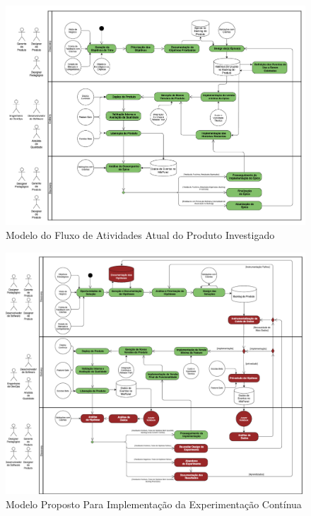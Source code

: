 \begin{figure}
    \centering
    \caption{Modelo do Fluxo de Atividades Atual do Produto Investigado}
    \includegraphics[width=1\linewidth]{figuras/processo-atual.png}
    \begin{center}
    \end{center}
    \label{fig:processo-atual}
\end{figure}

\begin{figure}
    \centering
    \caption{Modelo Proposto Para Implementação da Experimentação Contínua}
    \includegraphics[width=1\linewidth]{figuras/processo-novo.png}
    \begin{center}
    \end{center}
    \label{fig:processo-novo}
\end{figure}

